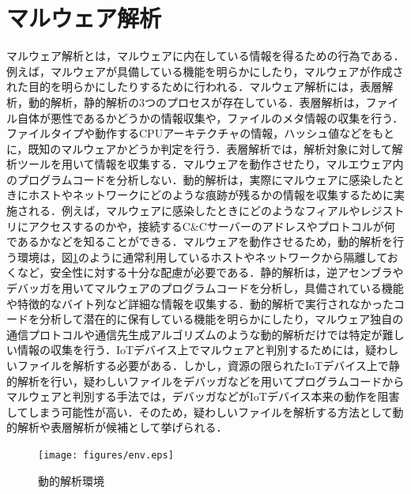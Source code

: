 \section{マルウェア解析}

マルウェア解析とは，マルウェアに内在している情報を得るための行為である．例えば，マルウェアが具備している機能を明らかにしたり，マルウェアが作成された目的を明らかにしたりするために行われる．マルウェア解析には，表層解析，動的解析，静的解析の3つのプロセスが存在している．表層解析は，ファイル自体が悪性であるかどうかの情報収集や，ファイルのメタ情報の収集を行う．ファイルタイプや動作するCPUアーキテクチャの情報，ハッシュ値などをもとに，既知のマルウェアかどうか判定を行う．表層解析では，解析対象に対して解析ツールを用いて情報を収集する．マルウェアを動作させたり，マルエウェア内のプログラムコードを分析しない．動的解析は，実際にマルウェアに感染したときにホストやネットワークにどのような痕跡が残るかの情報を収集するために実施される．例えば，マルウェアに感染したときにどのようなフィアルやレジストリにアクセスするのかや，接続するC\&Cサーバーのアドレスやプロトコルが何であるかなどを知ることができる．マルウェアを動作させるため，動的解析を行う環境は，図\ref{fig:env}のように通常利用しているホストやネットワークから隔離しておくなど，安全性に対する十分な配慮が必要である．静的解析は，逆アセンブラやデバッガを用いてマルウェアのプログラムコードを分析し，具備されている機能や特徴的なバイト列など詳細な情報を収集する．動的解析で実行されなかったコードを分析して潜在的に保有している機能を明らかにしたり，マルウェア独自の通信プロトコルや通信先生成アルゴリズムのような動的解析だけでは特定が難しい情報の収集を行う．IoTデバイス上でマルウェアと判別するためには，疑わしいファイルを解析する必要がある．しかし，資源の限られたIoTデバイス上で静的解析を行い，疑わしいファイルをデバッガなどを用いてプログラムコードからマルウェアと判別する手法では，デバッガなどがIoTデバイス本来の動作を阻害してしまう可能性が高い．そのため，疑わしいファイルを解析する方法として動的解析や表層解析が候補として挙げられる．

\newpage

\begin{figure}[h]
   \centering
      \texttt{[image: figures/env.eps]}
      \caption{動的解析環境}
   \label{fig:env}   
\end{figure}

